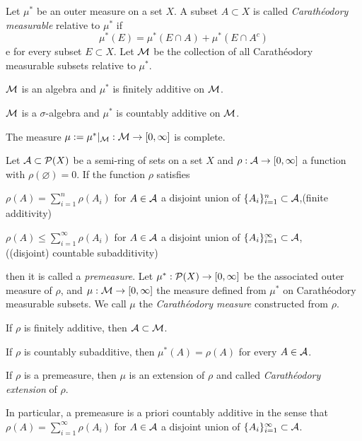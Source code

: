 \documentclass{../note}
\begin{document}
\begin{prb}
Let $\mu^*$ be an outer measure on a set $X$.
A subset $A\subset X$ is called \emph{Carath\'eodory measurable} relative to $\mu^*$ if
\[\mu^*(E)=\mu^*(E\cap A)+\mu^*(E\cap A^c)\]e
for every subset $E\subset X$.
Let $\mathcal{M}$ be the collection of all Carath\'eodory measurable subsets relative to $\mu^*$.
\begin{parts}
\item $\mathcal{M}$ is an algebra and $\mu^*$ is finitely additive on $\mathcal{M}$.
\item $\mathcal{M}$ is a $\sigma$-algebra and $\mu^*$ is countably additive on $\mathcal{M}$.
\item The measure $\mu:=\mu^*|_{\mathcal{M}}:\mathcal{M}\to[0,\infty]$ is complete.
\end{parts}
\end{prb}

\begin{prb}
Let $\mathcal{A}\subset\mathcal{P}(X)$ be a semi-ring of sets on a set $X$ and $\rho:\mathcal{A}\to[0,\infty]$ a function with $\rho(\varnothing)=0$.
If the function $\rho$ satisfies
\begin{parts}[(i)]
\item $\rho(A)=\sum_{i=1}^n\rho(A_i)$ for $A\in\mathcal{A}$ a disjoint union of $\{A_i\}_{i=1}^n\subset\mathcal{A}$,\hfill(finite additivity)
\item $\rho(A)\le\sum_{i=1}^\infty\rho(A_i)$ for $A\in\mathcal{A}$ a disjoint union of $\{A_i\}_{i=1}^\infty\subset\mathcal{A}$,\\\null\hfill((disjoint) countable subadditivity)
\end{parts}
then it is called a \emph{premeasure}.
Let $\mu^*:\mathcal{P}(X)\to[0,\infty]$ be the associated outer measure of $\rho$, and $\mu:\mathcal{M}\to[0,\infty]$ the measure defined from $\mu^*$ on Carath\'eodory measurable subsets.
We call $\mu$ the \emph{Carath\'eodory measure} constructed from $\rho$.
\begin{parts}
\item If $\rho$ is finitely additive, then $\mathcal{A}\subset\mathcal{M}$.
\item If $\rho$ is countably subadditive, then $\mu^*(A)=\rho(A)$ for every $A\in\mathcal{A}$.
\item If $\rho$ is a premeasure, then $\mu$ is an extension of $\rho$ and called \emph{Carath\'eodory extension} of $\rho$.
\item In particular, a premeasure is a priori countably additive in the sense that $\rho(A)=\sum_{i=1}^\infty\rho(A_i)$ for $A\in\mathcal{A}$ a disjoint union of $\{A_i\}_{i=1}^\infty\subset\mathcal{A}$.
\end{parts}
\end{prb}
\end{document}
